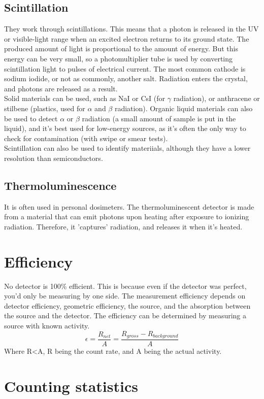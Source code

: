 \subsection{Scintillation}
They work through scintillations. This means that a photon is released in the UV or visible-light range when an excited electron returns to its ground state. The produced amount of light is proportional to the amount of energy. But this energy can be very small, so a photomultiplier tube is used by converting scintillation light to pulses of electrical current. The most common cathode is sodium iodide, or not as commonly, another salt. Radiation enters the crystal, and photons are released as a result.\\
Solid materials can be used, such as NaI or CsI (for $\gamma$ radiation), or anthracene or stilbene (plastics, used for $\alpha$ and $\beta$ radiation). Organic liquid materials can also be used to detect $\alpha$ or $\beta$ radiation (a small amount of sample is put in the liquid), and it's best used for low-energy sources, as it's often the only way to check for contamination (with swipe or smear tests).\\
Scintillation can also be used to identify materiials, although they have a lower resolution than semiconductors.

\subsection{Thermoluminescence}
It is often used in personal dosimeters. The thermoluminescent detector is made from a material that can emit photons upon heating after exposure to ionizing radiation. Therefore, it 'captures' radiation, and releases it when it's heated.

\section{Efficiency}
No detector is 100\% efficient. This is because even if the detector was perfect, you'd only be measuring by one side. The measurement efficiency depends on detector efficiency, geometric efficiency, the source, and the absorption between the source and the detector. The efficiency can be determined by measuring a source with known activity.
\[ \epsilon = \frac{R_{net}}{A} = \frac{R_{gross}-R_{background}}{A}\]
Where R<A, R being the count rate, and A being the actual activity. 

\section{Counting statistics}

